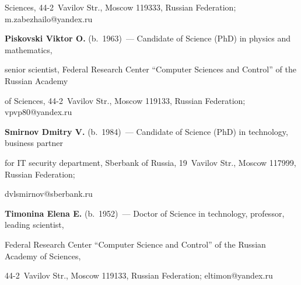Sciences, 44-2~Vavilov Str., Moscow 119333, Russian Federation; \mbox{m.zabezhailo@yandex.ru}





\vspace*{3pt}





\noindent


\textbf{Piskovski Viktor O.} (b.\ 1963)~--- Candidate of Science (PhD) in physics and mathematics, 


senior scientist, Federal Research Center ``Computer Sciences and Control'' of the Russian Academy 


of Sciences, 44-2~Vavilov Str., Moscow 119133, Russian Federation; \mbox{vpvp80@yandex.ru}





\vspace*{3pt}





\noindent


\textbf{Smirnov Dmitry V.} (b.\ 1984)~--- Candidate of Science (PhD) in technology, business partner 


for IT security department, Sberbank of Russia, 19~Vavilov Str., Moscow 117999, Russian Federation; 


\mbox{dvlsmirnov@sberbank.ru}





\vspace*{3pt}





\noindent


\textbf{Timonina Elena E.} (b.\ 1952)~--- Doctor of Science in technology, professor, leading scientist, 


Federal Research Center ``Computer Science and Control'' of the Russian Academy of Sciences, 


 44-2~Vavilov Str., Moscow 119133, Russian Federation; \mbox{eltimon@yandex.ru}


  


\label{end\stat}





\renewcommand{\bibname}{\protect\rm Литература}    


